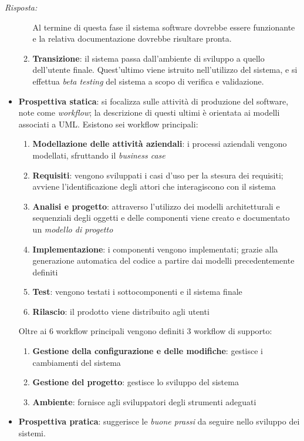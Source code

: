 \documentclass{article}
\newenvironment{solution}
    {\textit{Risposta:}}
    {}
\begin{document}
\begin{solution}
\begin{itemize}
\begin{enumerate}
		Al termine di questa fase il sistema software dovrebbe essere funzionante e la relativa documentazione dovrebbe risultare pronta.
		\item \textbf{Transizione}: il sistema passa dall'ambiente di sviluppo a quello dell'utente finale. Quest'ultimo viene istruito nell'utilizzo del sistema, e si effettua \textit{beta testing} del sistema a scopo di verifica e validazione.
	\end{enumerate}
	\item \textbf{Prospettiva statica}: si focalizza sulle attività di produzione del software, note come \textit{workflow}; la descrizione di questi ultimi è orientata ai modelli associati a UML.
	Esistono sei workflow principali:
	\begin{enumerate}
		\item \textbf{Modellazione delle attività aziendali}: i processi aziendali vengono modellati, sfruttando il \textit{business case}
		\item \textbf{Requisiti}: vengono sviluppati i casi d'uso per la stesura dei requisiti; avviene l'identificazione degli attori che interagiscono con il sistema
		\item \textbf{Analisi e progetto}: attraverso l'utilizzo dei modelli architetturali e sequenziali degli oggetti e delle componenti viene creato e documentato un \textit{modello di progetto}
		\item \textbf{Implementazione}: i componenti vengono implementati; grazie alla generazione automatica del codice a partire dai modelli precedentemente definiti
		\item \textbf{Test}: vengono testati i sottocomponenti e il sistema finale
		\item \textbf{Rilascio}: il prodotto viene distribuito agli utenti
	\end{enumerate}
	Oltre ai 6 workflow principali vengono definiti 3 workflow di supporto:
	\begin{enumerate}
		\item \textbf{Gestione della configurazione e delle modifiche}: gestisce i cambiamenti del sistema
		\item \textbf{Gestione del progetto}: gestisce lo sviluppo del sistema
		\item \textbf{Ambiente}: fornisce agli sviluppatori degli strumenti adeguati
	\end{enumerate}
	\item \textbf{Prospettiva pratica}: suggerisce le \textit{buone prassi} da seguire nello sviluppo dei sistemi.

\end{itemize}
\end{solution}
\end{document}
